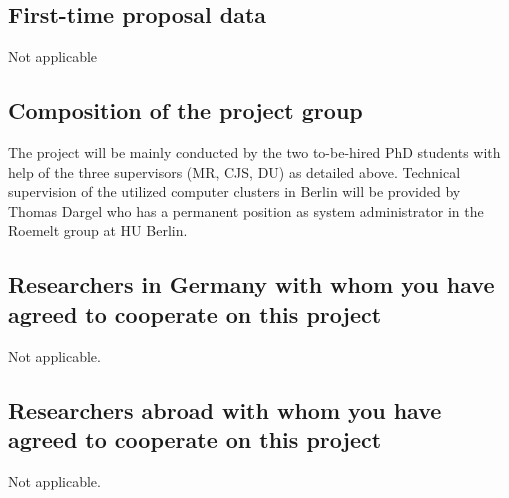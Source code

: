 \documentclass[a4paper,11pt,headings=normal]{scrartcl}
\begin{document}
\begin{itemize}
\subsection{First-time proposal data}
Not applicable

\subsection{Composition of the project group}
The project will be mainly conducted by the two to-be-hired PhD students with 
help of the three supervisors (MR, CJS, DU) as detailed above.  Technical 
supervision of the utilized computer clusters in Berlin will be provided by 
Thomas Dargel who has a permanent position as system administrator in the 
Roemelt group at HU Berlin. 

\subsection{Researchers in Germany with whom you have agreed to cooperate on this project}
Not applicable.

\subsection{Researchers abroad with whom you have agreed to cooperate on this 
project}
Not applicable.


\end{itemize}
\end{document}
